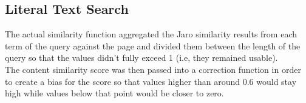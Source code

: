 \subsection{Literal Text Search}

The actual similarity function aggregated the Jaro similarity results from each term of the query against the page and divided them between the length of the query so that the values didn't fully exceed 1 (i.e, they remained usable). \\

The content similarity score was then passed into a correction function in order to create a bias for the score so that values higher than around 0.6 would stay high while values below that point would be closer to zero.

